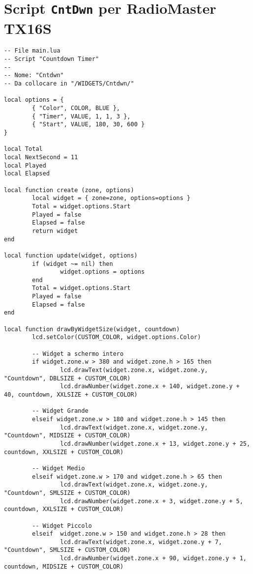 \section*{Script \texttt{CntDwn} per RadioMaster TX16S}
\begin{lstlisting}
-- File main.lua
-- Script "Countdown Timer"
--
-- Nome: "Cntdwn"
-- Da collocare in "/WIDGETS/Cntdwn/"

local options = {
        { "Color", COLOR, BLUE },
        { "Timer", VALUE, 1, 1, 3 },
        { "Start", VALUE, 180, 30, 600 }
}

local Total             
local NextSecond = 11   
local Played            
local Elapsed           

local function create (zone, options)
        local widget = { zone=zone, options=options }
        Total = widget.options.Start
        Played = false
        Elapsed = false
        return widget
end

local function update(widget, options)
        if (widget ~= nil) then
                widget.options = options
        end
        Total = widget.options.Start
        Played = false
        Elapsed = false
end

local function drawByWidgetSize(widget, countdown)
        lcd.setColor(CUSTOM_COLOR, widget.options.Color)

        -- Widget a schermo intero
        if widget.zone.w > 380 and widget.zone.h > 165 then
                lcd.drawText(widget.zone.x, widget.zone.y, "Countdown", DBLSIZE + CUSTOM_COLOR)
                lcd.drawNumber(widget.zone.x + 140, widget.zone.y + 40, countdown, XXLSIZE + CUSTOM_COLOR)

        -- Widget Grande
        elseif widget.zone.w > 180 and widget.zone.h > 145 then
                lcd.drawText(widget.zone.x, widget.zone.y, "Countdown", MIDSIZE + CUSTOM_COLOR)
                lcd.drawNumber(widget.zone.x + 13, widget.zone.y + 25, countdown, XXLSIZE + CUSTOM_COLOR)

        -- Widget Medio
        elseif widget.zone.w > 170 and widget.zone.h > 65 then
                lcd.drawText(widget.zone.x, widget.zone.y, "Countdown", SMLSIZE + CUSTOM_COLOR)
                lcd.drawNumber(widget.zone.x + 3, widget.zone.y + 5, countdown, XXLSIZE + CUSTOM_COLOR)

        -- Widget Piccolo
        elseif  widget.zone.w > 150 and widget.zone.h > 28 then
                lcd.drawText(widget.zone.x, widget.zone.y + 7, "Countdown", SMLSIZE + CUSTOM_COLOR)
                lcd.drawNumber(widget.zone.x + 90, widget.zone.y + 1, countdown, MIDSIZE + CUSTOM_COLOR)


\end{lstlisting}
